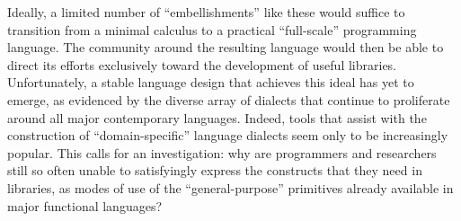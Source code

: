 Ideally, a limited number of ``embellishments'' like these would suffice to transition from a minimal calculus to a practical ``full-scale'' programming language. The community around the resulting language would then be able to direct its efforts exclusively toward the development of useful libraries. Unfortunately, a stable language design that achieves this ideal has yet to emerge, as evidenced by the diverse array of {dialects} that continue to proliferate around all major contemporary languages. %
Indeed, tools that assist with the construction of  ``domain-specific'' language dialects seem only to be increasingly popular. 
{This calls for an investigation}: why are programmers and researchers still so often unable to satisfyingly express the constructs that they need in libraries, as modes of use of the ``general-purpose'' primitives already available in major functional languages?


